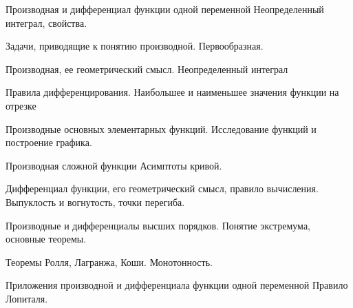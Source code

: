 \documentclass[
	14pt,
	a4paper,
	]
	{scrartcl}
\begin{document}
\vfill
\z 	Производная и дифференциал функции одной переменной
 \vfill
\z 	Неопределенный интеграл, свойства.
 \vfill

\vfill

\newpage


\shapk
{}
\setcounter{zad}{0}

\vfill
\z 	Задачи, приводящие к понятию производной.
 \vfill
\z 	Первообразная.
 \vfill

\vfill

\newpage


\shapk
{}
\setcounter{zad}{0}

\vfill
\z 	Производная, ее геометрический смысл.
 \vfill
\z 	Неопределенный интеграл
 \vfill

\vfill

\newpage


\shapk
{}
\setcounter{zad}{0}

\vfill
\z 	Правила дифференцирования.
 \vfill
\z 	Наибольшее и наименьшее значения функции на отрезке
 \vfill

\vfill

\newpage


\shapk
{}
\setcounter{zad}{0}

\vfill
\z 	Производные основных элементарных функций.
 \vfill
\z 	Исследование функций и построение графика.
 \vfill

\vfill

\newpage


\shapk
{}
\setcounter{zad}{0}

\vfill
\z 	Производная сложной  функции
 \vfill
\z 	Асимптоты кривой.
 \vfill

\vfill

\newpage


\shapk
{}
\setcounter{zad}{0}

\vfill
\z 	Дифференциал функции, его геометрический смысл, правило вычисления.
 \vfill
\z 	Выпуклость и вогнутость, точки перегиба. 
 \vfill

\vfill

\newpage


\shapk
{}
\setcounter{zad}{0}

\vfill
\z 	Производные и дифференциалы высших порядков. 
 \vfill
\z 	Понятие экстремума, основные теоремы.
 \vfill

\vfill

\newpage


\shapk
{}
\setcounter{zad}{0}

\vfill
\z 	Теоремы Ролля, Лагранжа, Коши.
 \vfill
\z 	Монотонность.
 \vfill

\vfill

\newpage


\shapk
{}
\setcounter{zad}{0}

\vfill
\z 	Приложения производной и дифференциала функции одной переменной
 \vfill
\z 	Правило Лопиталя.
 \vfill

\vfill

\newpage
\end{document}
